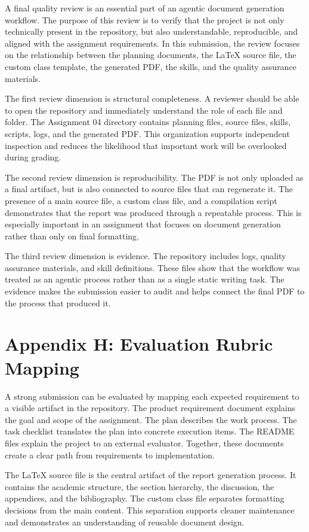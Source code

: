 \documentclass{custom-academic-template}
\begin{document}
A final quality review is an essential part of an agentic document generation workflow. The purpose of this review is to verify that the project is not only technically present in the repository, but also understandable, reproducible, and aligned with the assignment requirements. In this submission, the review focuses on the relationship between the planning documents, the LaTeX source file, the custom class template, the generated PDF, the skills, and the quality assurance materials.

The first review dimension is structural completeness. A reviewer should be able to open the repository and immediately understand the role of each file and folder. The Assignment 04 directory contains planning files, source files, skills, scripts, logs, and the generated PDF. This organization supports independent inspection and reduces the likelihood that important work will be overlooked during grading.

The second review dimension is reproducibility. The PDF is not only uploaded as a final artifact, but is also connected to source files that can regenerate it. The presence of a main source file, a custom class file, and a compilation script demonstrates that the report was produced through a repeatable process. This is especially important in an assignment that focuses on document generation rather than only on final formatting.

The third review dimension is evidence. The repository includes logs, quality assurance materials, and skill definitions. These files show that the workflow was treated as an agentic process rather than as a single static writing task. The evidence makes the submission easier to audit and helps connect the final PDF to the process that produced it.

\newpage
\section{Appendix H: Evaluation Rubric Mapping}

A strong submission can be evaluated by mapping each expected requirement to a visible artifact in the repository. The product requirement document explains the goal and scope of the assignment. The plan describes the work process. The task checklist translates the plan into concrete execution items. The README files explain the project to an external evaluator. Together, these documents create a clear path from requirements to implementation.

The LaTeX source file is the central artifact of the report generation process. It contains the academic structure, the section hierarchy, the discussion, the appendices, and the bibliography. The custom class file separates formatting decisions from the main content. This separation supports cleaner maintenance and demonstrates an understanding of reusable document design.
\end{document}
